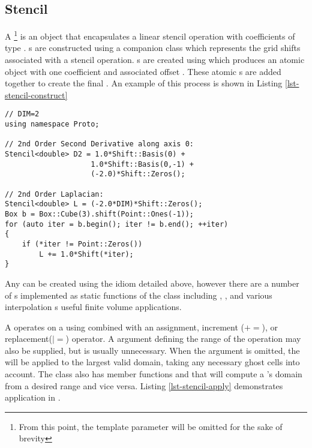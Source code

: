 \documentclass[12pt]{article}
\begin{document}
\subsection{Stencil}

A \footnote{From this point, the template parameter  will be omitted for the sake of brevity} is an object that encapsulates a linear stencil operation with coefficients of type . s are constructed using a companion class  which represents the grid shifts associated with a stencil operation. s are created using  which produces an atomic  object with one coefficient  and associated offset . These atomic s are added together to create the final . An example of this process is shown in Listing \ref{lst-stencil-construct}

\begin{lstlisting}[caption=Stencil Construction, label=lst-stencil-construct]
// DIM=2
using namespace Proto;

// 2nd Order Second Derivative along axis 0:
Stencil<double> D2 = 1.0*Shift::Basis(0) +
					1.0*Shift::Basis(0,-1) +
					(-2.0)*Shift::Zeros();

// 2nd Order Laplacian:
Stencil<double> L = (-2.0*DIM)*Shift::Zeros();
Box b = Box::Cube(3).shift(Point::Ones(-1));
for (auto iter = b.begin(); iter != b.end(); ++iter)
{
	if (*iter != Point::Zeros())
		L += 1.0*Shift(*iter);
}
\end{lstlisting}
Any  can be created using the idiom detailed above, however there are a number of s implemented as static functions of the class  including , , and various interpolation s useful finite volume applications.

A  operates on a  using  combined with an assignment, increment ($+=$), or replacement($|=$) operator. A  argument defining the range of the operation may also be supplied, but is usually unnecessary. When the  argument is omitted, the  will be applied to the largest valid domain, taking any necessary ghost cells into account. The  class also has member functions  and  that will compute a 's domain from  a desired range and vice versa. Listing \ref{lst-stencil-apply} demonstrates  application in \libname .
\end{document}
